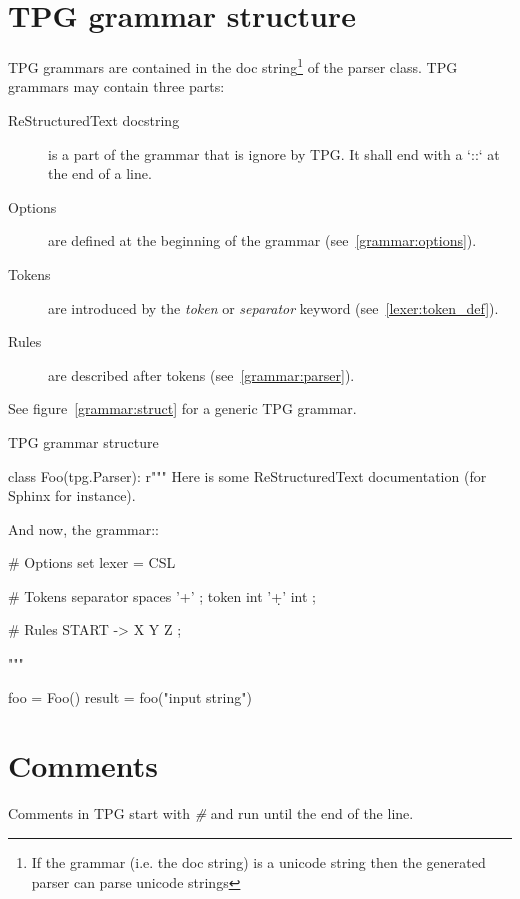 \section{TPG grammar structure}

TPG grammars are contained in the doc string\footnote{If the grammar (i.e. the doc string) is a unicode string then the generated parser can parse unicode strings} of the parser class.
TPG grammars may contain three parts:

\begin{description}
    \item [ReStructuredText docstring]
        is a part of the grammar that is ignore by TPG. It shall end with a `::` at the end of a line.
    \item [Options]
        are defined at the beginning of the grammar (see~\ref{grammar:options}).
    \item [Tokens]
        are introduced by the \emph{token} or \emph{separator} keyword (see~\ref{lexer:token_def}).
    \item [Rules]
        are described after tokens (see~\ref{grammar:parser}).
\end{description}

See figure~\ref{grammar:struct} for a generic TPG grammar.

\begin{code}
\caption{TPG grammar structure}                             \label{grammar:struct}
\begin{verbatimtab}[4]
class Foo(tpg.Parser):
    r"""
    Here is some ReStructuredText documentation
    (for Sphinx for instance).

    And now, the grammar::

        # Options
        set lexer = CSL

        # Tokens
        separator spaces    '\s+'       ;
        token int           '\d+'   int ;

        # Rules
        START -> X Y Z ;

    """

foo = Foo()
result = foo("input string")
\end{verbatimtab}
\end{code}

\section{Comments}

Comments in TPG start with \emph{\#} and run until the end of the line.

